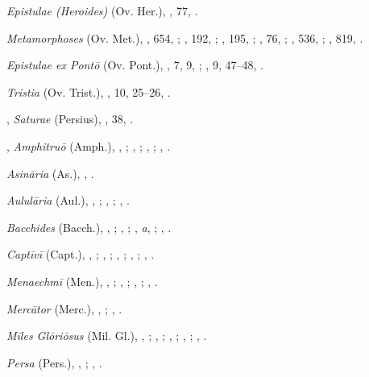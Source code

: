 \begin{autindex}
  \subitem \emph{Epistulae (Heroides)} (Ov. Her.),
    , 77, .

  \subitem \emph{Metamorphoses} (Ov. Met.),
    , 654, ;
    , 192, ;
    , 195, ;
    ,  76, ;
    , 536, ;
    , 819, .

  \subitem \emph{Epistulae ex Pontō} (Ov. Pont.),
    , 7,  9, ;
    , 9, 47–48, .

  \subitem \emph{Tristia} (Ov. Trist.),
    , 10, 25–26, .

\indexspace

,
  \subitem \emph{Saturae} (Persius),
    , 38, .

\indexspace

,
  \subitem \emph{Amphitruō} (Amph.),
    , ;
    , ;
    , ;
    , .

  \subitem \emph{Asināria} (As.),
    , .

  \subitem \emph{Aululāria} (Aul.),
    , ;
    , ;
    , .

  \subitem \emph{Bacchides} (Bacch.),
    , ;
    , ;
    , \emph{a}, ;
    , .

  \subitem \emph{Captīvī} (Capt.),
    , ;
    , ;
    , ;
    , ;
    , .

  \subitem \emph{Menaechmī} (Men.),
    , ;
    , ;
    , ;
    , .

  \subitem \emph{Mercātor} (Merc.),
    , ;
    , .

  \subitem \emph{Mīles Glōriōsus} (Mil. Gl.),
    , ;
    , ;
    , ;
    , ;
    , .

  \subitem \emph{Persa} (Pers.),
    , ;
    , .


\end{autindex}

